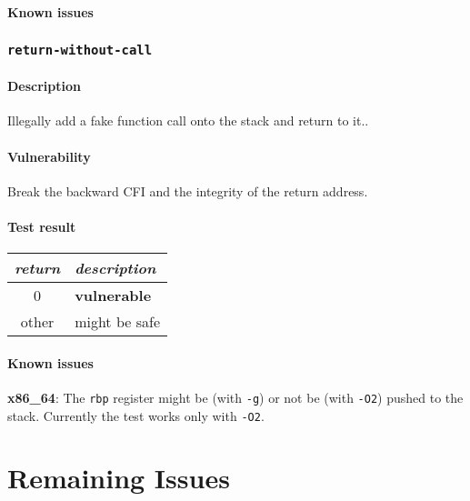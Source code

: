 \documentclass[a4paper]{book}
\begin{document}
\subsubsection{Known issues}


\newpage

\subsection{\texttt{return-without-call}}\label{test-return-without-call}

\subsubsection{Description}
Illegally add a fake function call onto the stack and return to it..

\subsubsection{Vulnerability}
Break the backward CFI and the integrity of the return address.

\subsubsection{Test result}
\begin{tabular}{cl}
  \toprule
  \emph{return}  & \emph{description} \\
  \midrule
  0              & \textbf{vulnerable} \\
  other          & might be safe \\
  \bottomrule
\end{tabular}
  
\subsubsection{Known issues}
\textbf{x86\_64}: The \texttt{rbp} register might be (with \texttt{-g}) or not be (with \texttt{-O2}) pushed to the stack.
Currently the test works only with \texttt{-O2}.

\chapter{Remaining Issues}
\end{document}
